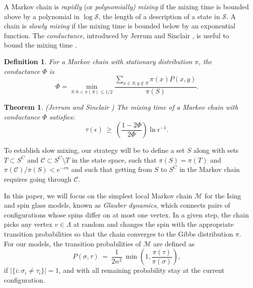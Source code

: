 \documentclass[letterpaper,english,numberwithinsect]{amsart}
\newtheorem{theorem}{Theorem}
\newtheorem{definition}{Definition}[section]
\newcommand{\cC}{\mathcal{C}}
\newcommand{\cS}{\mathcal{S}}
\begin{document}
\noindent A Markov chain is \emph{rapidly} (or {\it polynomially) mixing}  if the mixing
time is bounded above by a polynomial in $\log{\cS}$, the length of a description of a state in $\cS$.
A chain is \emph{slowly mixing} if the mixing time is bounded below by an exponential
function. 
The {\it conductance}, introduced by Jerrum and Sinclair \cite{js}, is useful to bound the
 mixing time \cite{js}. 

\begin{definition}
For a Markov chain with stationary distribution $\pi$,  the
\emph{conductance} $\Phi$ is 
$$\Phi =\min_{S: 0 < \pi(S)\leq 1/2} \frac{\sum_{x\in S, y\not\in S}
 \pi(x) P(x,y)}{\pi(S)}.$$ 
\end{definition}



\begin{theorem}
  \label{CondThm}
  {\rm (Jerrum and Sinclair \cite{js})}
  The mixing time of a Markov chain with conductance
  $\Phi$ satisfies:
  \[\tau(\epsilon) \ \geq \
  \left( \frac{1-2\Phi}{2\Phi} \right)\ln \epsilon^{-1}.\]
\end{theorem}



\noindent To establish slow mixing, our strategy will be to define a set $S$ along with sets $T \subset S^C$ and $\cC \subset S^C \setminus T$ in the state space, such that $\pi(S) = \pi(T)$ and $\pi(\cC)/\pi(S) < e^{-cn}$ and such that getting from $S$ to $S^C$ in the Markov chain requires going through $\cC$. 

In this paper, we will focus on the simplest local Markov chain ${\mathcal M}$ for the Ising and spin glass models, known as {\it Glauber dynamics}, which connects pairs of configurations whose spins differ on at most one vertex. In a given step, the chain picks any vertex $v \in \Lambda$ at random and changes the spin with the appropriate transition probabilities so that the chain converges to the Gibbs distribution $\pi$. For our  models, the transition probabilities of ${\mathcal M}$ are defined as
$$P(\sigma, \tau) \ = \ \frac{1}{2 n^2} \ \min \left( 1, \frac{\pi(\tau)}{\pi(\sigma)}\right),$$
if $|\{i: \sigma_i \neq \tau_i\}| = 1$, and with all remaining probability stay at the current configuration.
\end{document}
